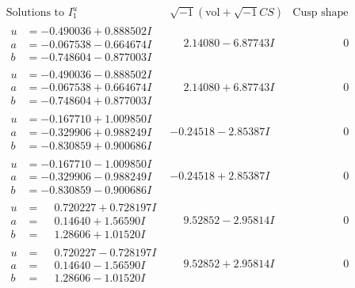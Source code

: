 \documentclass[1p]{elsarticle_modified}
\theoremstyle{definition}
\newcommand{\I}{\sqrt{-1}}
\begin{document}
$$\begin{array}{c|c|c}  
\text{Solutions to }I^u_{1}& \I (\text{vol} + \sqrt{-1}CS) & \text{Cusp shape}\\
 \hline 
\begin{aligned}
u &= -0.490036 + 0.888502 I \\
a &= -0.067538 - 0.664674 I \\
b &= -0.748604 - 0.877003 I\end{aligned}
 & \phantom{-}2.14080 - 6.87743 I & \phantom{-0.000000 } 0 \\ \hline\begin{aligned}
u &= -0.490036 - 0.888502 I \\
a &= -0.067538 + 0.664674 I \\
b &= -0.748604 + 0.877003 I\end{aligned}
 & \phantom{-}2.14080 + 6.87743 I & \phantom{-0.000000 } 0 \\ \hline\begin{aligned}
u &= -0.167710 + 1.009850 I \\
a &= -0.329906 + 0.988249 I \\
b &= -0.830859 + 0.900686 I\end{aligned}
 & -0.24518 - 2.85387 I & \phantom{-0.000000 } 0 \\ \hline\begin{aligned}
u &= -0.167710 - 1.009850 I \\
a &= -0.329906 - 0.988249 I \\
b &= -0.830859 - 0.900686 I\end{aligned}
 & -0.24518 + 2.85387 I & \phantom{-0.000000 } 0 \\ \hline\begin{aligned}
u &= \phantom{-}0.720227 + 0.728197 I \\
a &= \phantom{-}0.14640 + 1.56590 I \\
b &= \phantom{-}1.28606 + 1.01520 I\end{aligned}
 & \phantom{-}9.52852 - 2.95814 I & \phantom{-0.000000 } 0 \\ \hline\begin{aligned}
u &= \phantom{-}0.720227 - 0.728197 I \\
a &= \phantom{-}0.14640 - 1.56590 I \\
b &= \phantom{-}1.28606 - 1.01520 I\end{aligned}
 & \phantom{-}9.52852 + 2.95814 I & \phantom{-0.000000 } 0 \\ \hline\begin{aligned}

\end{aligned}
\end{array}$$
\end{document}
